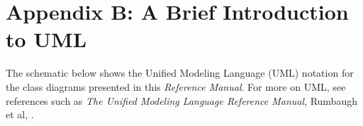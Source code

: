 %

\section{Appendix B:  A Brief Introduction to UML}

The schematic below shows the Unified Modeling Language (UML) notation 
for the class diagrams presented in this {\it Reference Manual}.  For 
more on UML, see references such as {\it The Unified Modeling Language 
Reference Manual}, Rumbaugh et al, \cite{uml}.


\begin{center}
\end{center}


